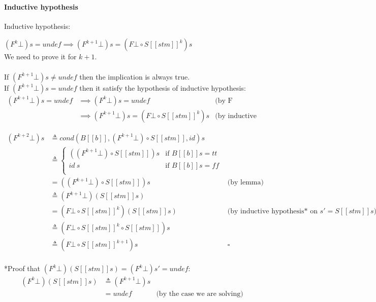 \documentclass{article}
\begin{document}
\paragraph{Inductive hypothesis}$\;$\\
Inductive hypothesis:

$(F^k\bot) s = undef \implies 
(F^{k+1}\bot) s  = (F\bot \circ S[\![stm]\!]^k)s$
\\
We need to prove it for $k+1$.\\
\\
If $(F^{k+1}\bot) s \ne undef$ then the implication is always true.\\
If $(F^{k+1}\bot) s = undef$ then it satisfy the hypothesis of inductive hypothesis:
$$
\begin{aligned}
    (F^{k+1}\bot) s = undef
    &\implies (F^{k}\bot) s = undef                             & \text{(by F monotonicity)} \\
    &\implies (F^{k+1}\bot) s = (F\bot \circ S[\![stm]\!]^k)s   & \text{(by inductive hypothesis)}
\end{aligned}
$$

$$
\begin{aligned}
    (F^{k+2}\bot) s 
    & \triangleq cond(B[\![b]\!],(F^{k+1}\bot) \circ S[\![stm]\!],id) s \\
    & \triangleq
    \begin{cases}
        ((F^{k+1}\bot) \circ S[\![stm]\!]) s & \text{if $B[\![b]\!]s = tt$}\\
        id\ s & \text{if $B[\![b]\!]s = ff$}\\
    \end{cases} \\
    & = ((F^{k+1}\bot) \circ S[\![stm]\!])s & \text{(by lemma)} \\
    & \triangleq (F^{k+1}\bot)(S[\![stm]\!]s) \\
    & = (F\bot \circ S[\![stm]\!]^k)(S[\![stm]\!]s) & \text{(by inductive hypothesis* on $s'=S[\![stm]\!]s$)}\\
    & \triangleq (F\bot \circ S[\![stm]\!]^k \circ S[\![stm]\!])s \\
    & \triangleq (F\bot \circ S[\![stm]\!]^{k+1})s & \square\\
\end{aligned}
$$

*Proof that $(F^k\bot)(S[\![stm]\!]s) = (F^k\bot)s' = undef $:
$$
\begin{aligned}
    (F^k\bot)(S[\![stm]\!]s)
    & \triangleq (F^{k+1}\bot) s \\ 
    & = undef                     & \text{(by the case we are solving)} 
\end{aligned}
$$
\end{document}
